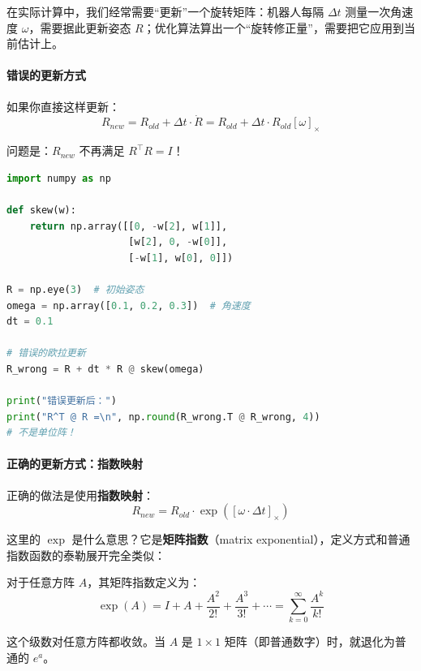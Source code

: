 在实际计算中，我们经常需要“更新”一个旋转矩阵：机器人每隔 $\Delta t$ 测量一次角速度 $\omega$，需要据此更新姿态 $R$；优化算法算出一个“旋转修正量”，需要把它应用到当前估计上。

\paragraph{错误的更新方式}

如果你直接这样更新：
\begin{equation}
R_{new} = R_{old} + \Delta t \cdot \dot{R} = R_{old} + \Delta t \cdot R_{old} [\omega]_\times
\end{equation}

问题是：$R_{new}$ 不再满足 $R^\top R = I$！

\begin{lstlisting}[style=teaching, language=Python]
import numpy as np

def skew(w):
    return np.array([[0, -w[2], w[1]], 
                     [w[2], 0, -w[0]], 
                     [-w[1], w[0], 0]])

R = np.eye(3)  # 初始姿态
omega = np.array([0.1, 0.2, 0.3])  # 角速度
dt = 0.1

# 错误的欧拉更新
R_wrong = R + dt * R @ skew(omega)

print("错误更新后：")
print("R^T @ R =\n", np.round(R_wrong.T @ R_wrong, 4))
# 不是单位阵！
\end{lstlisting}

\paragraph{正确的更新方式：指数映射}

正确的做法是使用\textbf{指数映射}：
\begin{equation}
R_{new} = R_{old} \cdot \exp([\omega \cdot \Delta t]_\times)
\end{equation}

这里的 $\exp$ 是什么意思？它是\textbf{矩阵指数}（matrix exponential），定义方式和普通指数函数的泰勒展开完全类似：

\begin{definition}[矩阵指数]
对于任意方阵 $A$，其矩阵指数定义为：
\begin{equation}
\exp(A) = I + A + \frac{A^2}{2!} + \frac{A^3}{3!} + \cdots = \sum_{k=0}^{\infty} \frac{A^k}{k!}
\end{equation}

这个级数对任意方阵都收敛。当 $A$ 是 $1 \times 1$ 矩阵（即普通数字）时，就退化为普通的 $e^a$。
\end{definition}

